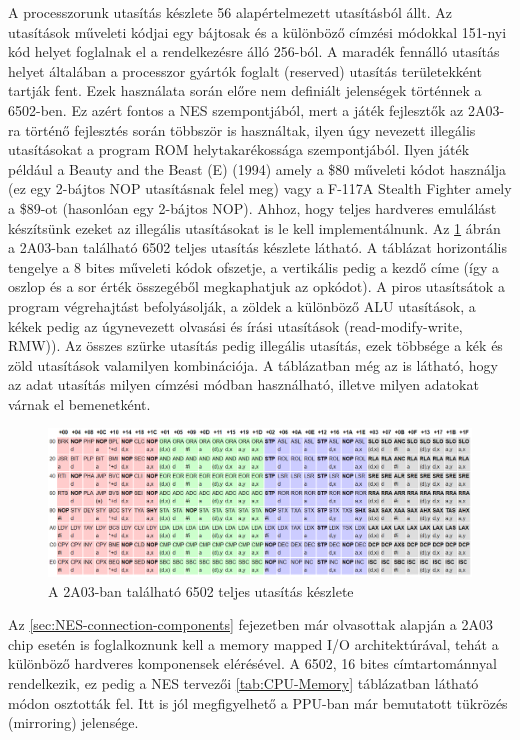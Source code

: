 	A processzorunk utasítás készlete 56 alapértelmezett utasításból állt. Az utasítások műveleti kódjai egy bájtosak és a különböző címzési módokkal 151-nyi kód helyet foglalnak el a rendelkezésre álló 256-ból. A maradék fennálló utasítás helyet általában a processzor gyártók foglalt (reserved) utasítás területekként tartják fent. Ezek használata során előre nem definiált jelenségek történnek a 6502-ben. Ez azért fontos a NES szempontjából, mert a játék fejlesztők az 2A03-ra történő fejlesztés során többször is használtak, ilyen úgy nevezett illegális utasításokat a program ROM helytakarékossága szempontjából. Ilyen játék például a Beauty and the Beast (E) (1994) amely a \$80 műveleti kódot használja (ez egy 2-bájtos NOP utasításnak felel meg) vagy a F-117A Stealth Fighter amely a \$89-ot (hasonlóan egy 2-bájtos NOP). Ahhoz, hogy teljes hardveres emulálást készítsünk ezeket az illegális utasításokat is le kell implementálnunk. Az \ref{fig:2A03-Opcodes} ábrán a 2A03-ban található 6502 teljes utasítás készlete látható. A táblázat horizontális tengelye a 8 bites műveleti kódok ofszetje, a vertikális pedig a kezdő címe (így a oszlop és a sor érték összegéből megkaphatjuk az opkódot). A piros utasítsátok a program végrehajtást befolyásolják, a zöldek a különböző ALU utasítások, a kékek pedig az úgynevezett olvasási és írási utasítások (read-modify-write, RMW)). Az összes szürke utasítás pedig illegális utasítás, ezek többsége a kék és zöld utasítások valamilyen kombinációja. A táblázatban még az is látható, hogy az adat utasítás milyen címzési módban használható, illetve milyen adatokat várnak el bemenetként.
	
	\begin{figure}[H]
		\centering
		\includegraphics[width=150mm, keepaspectratio]{figures/2A03-opcodes}
		\caption{A 2A03-ban található 6502 teljes utasítás készlete}
		\label{fig:2A03-Opcodes}
	\end{figure}
	
	Az \ref{sec:NES-connection-components} fejezetben már olvasottak alapján a 2A03 chip esetén is foglalkoznunk kell a memory mapped I/O architektúrával, tehát a különböző hardveres komponensek elérésével. A 6502, 16 bites címtartománnyal rendelkezik, ez pedig a NES tervezői \ref{tab:CPU-Memory} táblázatban látható módon osztották fel. Itt is jól megfigyelhető a PPU-ban már bemutatott tükrözés (mirroring) jelensége.
	
